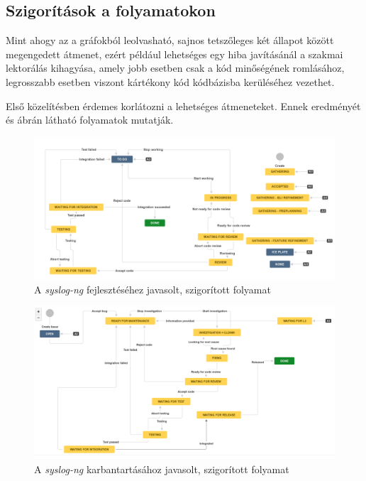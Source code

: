 \FloatBarrier
\pagebreak[3]
\subsection{Szigorítások a folyamatokon}

Mint ahogy az a gráfokból leolvasható, sajnos tetszőleges két állapot között megengedett átmenet,
ezért például lehetséges egy hiba javításánál a szakmai lektorálás kihagyása, amely jobb esetben
csak a kód minőségének romlásához, legrosszabb esetben viszont kártékony kód kódbázisba kerüléséhez
vezethet.

Első közelítésben érdemes korlátozni a lehetséges átmeneteket. Ennek eredményét
 és  ábrán látható folyamatok mutatják.

\begin{figure}[h]
    \includegraphics[width=\textwidth, keepaspectratio]{figures/newfeature.png}
    \centering
    \caption{A \emph{syslog-ng} fejlesztéséhez javasolt, szigorított folyamat}
    \label{fig:newfeature}
\end{figure}

\begin{figure}[h]
    \includegraphics[width=\textwidth, keepaspectratio]{figures/newmt.png}
    \centering
    \caption{A \emph{syslog-ng} karbantartásához javasolt, szigorított folyamat}
    \label{fig:newmt}
\end{figure}

